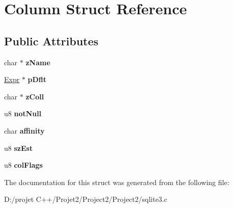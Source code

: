 \hypertarget{struct_column}{}\section{Column Struct Reference}
\label{struct_column}
\subsection*{Public Attributes}
\begin{DoxyCompactItemize}
\item 
\mbox{\label{struct_column_a6450a4e9fde68b3a2d79425d826eccc3}} 
char $\ast$ {\bfseries z\+Name}
\item 
\mbox{\label{struct_column_ac4178f302df70048235660979f84ffe4}} 
\mbox{\hyperlink{struct_expr}{Expr}} $\ast$ {\bfseries p\+Dflt}
\item 
\mbox{\label{struct_column_aa95909d5c77b321258622ed28d7b96eb}} 
char $\ast$ {\bfseries z\+Coll}
\item 
\mbox{\label{struct_column_a852e9a4c1c327a64d9b051dcafda3841}} 
u8 {\bfseries not\+Null}
\item 
\mbox{\label{struct_column_ac9d6fe31c45888cecaf3f5ad5b93bf23}} 
char {\bfseries affinity}
\item 
\mbox{\label{struct_column_a6d28f0023e550ea38ad2ab544942114d}} 
u8 {\bfseries sz\+Est}
\item 
\mbox{\label{struct_column_aadfed8f7a238c314e1499a6c4090f920}} 
u8 {\bfseries col\+Flags}
\end{DoxyCompactItemize}


The documentation for this struct was generated from the following file\+:\begin{DoxyCompactItemize}
\item 
D\+:/projet C++/\+Projet2/\+Project2/\+Project2/sqlite3.\+c\end{DoxyCompactItemize}
